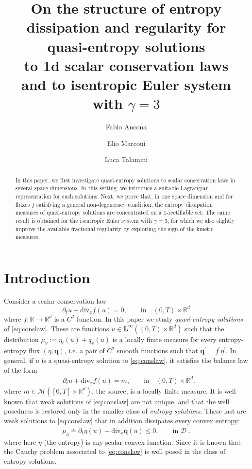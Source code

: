 \documentclass[11pt, twoside, reqno]{amsart}
\author{Fabio Ancona}
\author{Elio Marconi}
\author{Luca Talamini}
\title[Quasi-entropy solution to scalar balance laws]
{On the structure of entropy dissipation and regularity for quasi-entropy solutions \\ to 1d scalar conservation laws \\ and to isentropic Euler  system with $\gamma=3$}
\theoremstyle{definition}
\theoremstyle{remark}
\numberwithin{equation}{section}
\newcommand{\mr}[1]{\mathrm{#1}}
\newcommand{\bs}[1]{\boldsymbol{#1}}
\newcommand{\msc}[1]{\mathscr{#1}}
\begin{document}
\begin{abstract}
In this paper, we first investigate quasi-entropy solutions to scalar conservation laws in several space dimensions. In this setting, we introduce a suitable Lagrangian representation for such solutions. Next, we prove that, in one space dimension and for fluxes $f$ satisfying a general non-degeneracy condition, the entropy dissipation measures of quasi-entropy solutions are concentrated on a $1$-rectifiable set. The same result is obtained for the isentropic Euler system with $\gamma = 3$, for which we also slightly improve the available fractional regularity by exploiting the sign of the kinetic measures. 
\end{abstract}
\maketitle



\section{Introduction}
Consider a scalar conservation law
\begin{equation}\label{eq:conslaw}
    \partial_ t u + \mr{div}_x f(u) = 0,  \qquad \text{in} \quad (0, T) \times \mathbb R^d
\end{equation}
where $f: \mathbb R \to \mathbb R^d$ is a $C^2$ function. In this paper we study \emph{quasi-entropy solutions} of \eqref{eq:conslaw}. These are functions $u \in \mathbf L^{\infty}((0, T) \times \mathbb R^d)$ such that the distribution $\mu_\eta := \eta_t(u) + q_x(u)$ is a locally finite measure for every entropy-entropy flux $(\eta, \bs q)$, i.e. a pair of $C^2$ smooth functions such that $\bs q^\prime = f^\prime \eta^\prime$. In general, if $u$ is a quasi-entropy solution to \eqref{eq:conslaw}, it satisfies the balance law of the form
\begin{equation}\label{eq:scamultsource}
\begin{aligned}
    & \partial_t  u + \mathrm{div}_x f(u) = m, \qquad \text{in} \quad (0, T) \times \mathbb R^d.
    \end{aligned}
\end{equation}
where $m \in \msc M([0,T] \times \mathbb R^d)$, the source, is a locally finite measure. 
It is well known that weak solutions of \eqref{eq:conslaw} are not unique, and that the well posedness is restored only in the smaller class of \textit{entropy solutions}. These last are weak solutions to \eqref{eq:conslaw} that in addition dissipates every convex entropy:
\begin{equation}\label{eq:entropy}
    \mu_{\eta} \doteq \partial_ t \eta(u) + \mr{div}_x \bs q(u) \leq 0, \qquad \text{in $\msc D^{\prime}$}.
\end{equation}
where here $\eta$ (the entropy) is any scalar convex function.
Since \cite{Kr77} it is known that the Cauchy problem associated to \eqref{eq:conslaw} is well posed in the class of entropy solutions.
\end{document}
